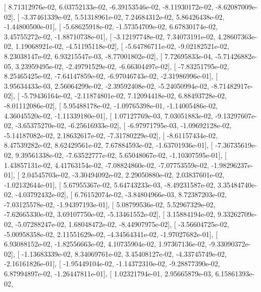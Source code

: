 \documentclass{article}
\begin{document}
       [  8.71312976e-02,   6.03752133e-02,  -6.39153546e-02,
         -8.11930172e-02,  -8.62087009e-02],
       [ -3.37461339e-02,   5.51318961e-02,   7.24684312e-02,
          5.86426438e-02,  -1.44800500e-01],
       [ -5.68625918e-02,  -1.57354709e-02,   6.67830174e-02,
          3.45755272e-02,  -1.88710738e-01],
       [ -3.12197748e-02,   7.34073191e-02,   4.28607363e-02,
          1.19068921e-02,  -4.51195118e-02],
       [ -5.64786711e-02,  -9.02182521e-02,   8.23038147e-02,
          6.93215547e-03,  -8.77001802e-02],
       [  7.72695833e-04,  -5.71426882e-05,   3.23959495e-02,
         -2.49791529e-02,  -6.66304497e-02],
       [ -7.83251795e-02,   8.25465425e-02,  -7.64147859e-02,
         -6.97046743e-02,  -2.31986996e-01],
       [  3.95634433e-03,   2.56064299e-02,  -2.39592408e-02,
         -5.24050994e-02,  -8.71482917e-02],
       [ -5.79436164e-02,  -2.11874801e-02,   7.12094418e-02,
          6.88493728e-02,  -8.01112086e-02],
       [  5.95488178e-02,  -1.09765398e-01,  -1.14005486e-02,
          4.36045520e-02,  -1.11339180e-01],
       [  1.07127769e-03,   7.03051883e-02,  -9.13297607e-02,
         -3.65375270e-02,  -6.25616933e-02],
       [ -6.97971795e-03,  -1.09692128e-02,  -5.14187082e-02,
          2.18632617e-02,  -7.31780229e-02],
       [ -8.61157434e-02,   8.47539282e-02,   8.62429561e-02,
          7.67884593e-02,  -1.63701936e-01],
       [ -7.36735619e-02,   9.39561338e-02,  -7.63522777e-02,
          5.65048067e-02,  -1.10307595e-01],
       [  1.43857131e-02,   4.41763154e-02,  -7.08824860e-02,
         -7.07753559e-02,  -1.98296237e-01],
       [  2.04545703e-02,  -3.30494092e-02,   2.29050880e-02,
          2.03837601e-02,  -1.02132644e-01],
       [  5.67955367e-02,   5.64743233e-03,  -8.49231587e-02,
          3.35484740e-02,  -4.03792432e-02],
       [  6.76152074e-02,  -3.84804966e-03,   8.72387203e-02,
         -7.03125578e-02,  -1.94397193e-01],
       [  5.08799536e-02,   5.52967329e-02,  -7.62665330e-02,
          3.69107750e-02,  -5.13461552e-02],
       [  3.15884194e-02,   9.33262709e-02,  -5.07288247e-02,
          1.68048472e-02,  -8.44907975e-02],
       [ -3.56604725e-02,  -5.00958358e-02,   2.11551629e-02,
         -4.34564341e-02,  -1.97027682e-01],
       [  6.93088152e-02,  -1.82556663e-02,   4.10735904e-02,
          1.97367136e-02,  -9.33090372e-02],
       [ -1.13683339e-02,   8.34069761e-02,   3.45408127e-02,
         -4.33745749e-02,  -2.16161826e-01],
       [ -1.95449104e-02,  -1.14372310e-02,  -9.28877390e-02,
          6.87994897e-02,  -1.26447811e-01],
       [  1.02321794e-01,   2.95665879e-03,   6.15861393e-02,
\end{document}
